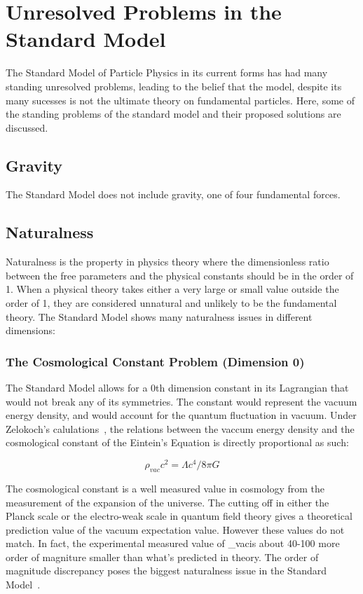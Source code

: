 \section{Unresolved Problems in the Standard Model}
The Standard Model of Particle Physics in its current forms has had many standing unresolved problems, leading to the belief that the model, despite its many sucesses is not the ultimate theory on fundamental particles. Here, some of the standing problems of the standard model and their proposed solutions are discussed.

\subsection{Gravity}
The Standard Model does not include gravity, one of four fundamental forces.     

\subsection{Naturalness}
Naturalness is the property in physics theory where the dimensionless ratio between the free parameters and the physical constants should be in the order of 1. When a physical theory takes either a very large or small value outside the order of 1, they are considered unnatural and unlikely to be the fundamental theory. 
The Standard Model shows many naturalness issues in different dimensions: 

\subsubsection{The Cosmological Constant Problem (Dimension 0)}
The Standard Model allows for a 0th dimension constant in its Lagrangian that would not break any of its symmetries. The constant would represent the vacuum energy density, and would account for the quantum fluctuation in vacuum. Under Zelokoch's calulations~\cite{zel1968cosmological}, the relations between the vaccum energy density and the cosmological constant of the Eintein's Equation is directly proportional as such:

\begin{equation}
    \rho_{vac}c^2=\Lambda c^4/8\pi G
\label{eq:cosmoconst}
\end{equation}

The cosmological constant is a well measured value in cosmology from the measurement of the expansion of the universe. The cutting off in either the Planck scale or the electro-weak scale in quantum field theory gives a theoretical prediction value of the vacuum expectation value. However these values do not match. In fact, the experimental measured value of \rho_{vac}is about 40-100 more order of magniture smaller than what's predicted in theory. The order of magnitude discrepancy poses the
biggest naturalness issue in the Standard Model~\cite{V2002}.

